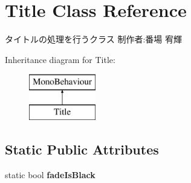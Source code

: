 \hypertarget{class_title}{}\section{Title Class Reference}
\label{class_title}


タイトルの処理を行うクラス 制作者\+:番場 宥輝  


Inheritance diagram for Title\+:\begin{figure}[H]
\begin{center}
\leavevmode
\includegraphics[height=2.000000cm]{class_title}
\end{center}
\end{figure}
\subsection*{Static Public Attributes}
\begin{DoxyCompactItemize}
\item 
\mbox{\label{class_title_a04cc21116aa24af1fbf2f6aae109efea}} 
static bool {\bfseries fade\+Is\+Black}
\end{DoxyCompactItemize}
